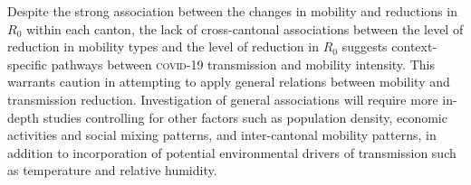 Despite the strong association between the changes in mobility and reductions in $R_0$ within each canton, the lack of cross-cantonal associations between the level of reduction in mobility types and the level of reduction in $R_0$ suggests context-specific pathways between \textsc{covid}-19 transmission and mobility intensity. This warrants caution in attempting to apply general relations between mobility and transmission reduction. Investigation of general associations will require more in-depth studies controlling for other factors such as population density, economic activities and social mixing patterns, and inter-cantonal mobility patterns, in addition to incorporation of potential environmental drivers of transmission such as temperature and relative humidity\cite{Neher:PotentialImpactSeasonal:2020, Kissler:ProjectingTransmissionDynamics:2020}. 
  
